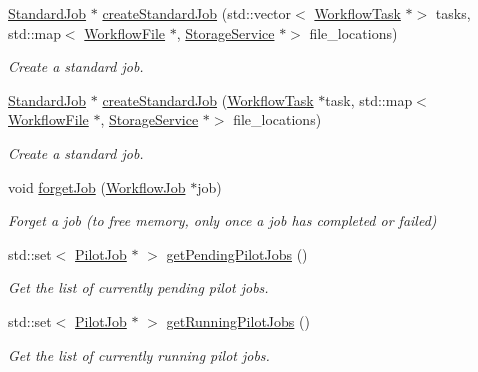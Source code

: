 \begin{DoxyCompactItemize}
\hyperlink{classwrench_1_1_standard_job}{Standard\+Job} $\ast$ \hyperlink{classwrench_1_1_job_manager_a1dc600a984151ddff2fe5d20525b33bc}{create\+Standard\+Job} (std\+::vector$<$ \hyperlink{classwrench_1_1_workflow_task}{Workflow\+Task} $\ast$$>$ tasks, std\+::map$<$ \hyperlink{classwrench_1_1_workflow_file}{Workflow\+File} $\ast$, \hyperlink{classwrench_1_1_storage_service}{Storage\+Service} $\ast$$>$ file\+\_\+locations)
\begin{DoxyCompactList}\small\item\em Create a standard job. \end{DoxyCompactList}\item 
\hyperlink{classwrench_1_1_standard_job}{Standard\+Job} $\ast$ \hyperlink{classwrench_1_1_job_manager_a42271d359373df86fdb59aeeaf0a4abc}{create\+Standard\+Job} (\hyperlink{classwrench_1_1_workflow_task}{Workflow\+Task} $\ast$task, std\+::map$<$ \hyperlink{classwrench_1_1_workflow_file}{Workflow\+File} $\ast$, \hyperlink{classwrench_1_1_storage_service}{Storage\+Service} $\ast$$>$ file\+\_\+locations)
\begin{DoxyCompactList}\small\item\em Create a standard job. \end{DoxyCompactList}\item 
void \hyperlink{classwrench_1_1_job_manager_ab10f770cc7ce3c022f889ad9cc3fcf0b}{forget\+Job} (\hyperlink{classwrench_1_1_workflow_job}{Workflow\+Job} $\ast$job)
\begin{DoxyCompactList}\small\item\em Forget a job (to free memory, only once a job has completed or failed) \end{DoxyCompactList}\item 
std\+::set$<$ \hyperlink{classwrench_1_1_pilot_job}{Pilot\+Job} $\ast$ $>$ \hyperlink{classwrench_1_1_job_manager_ad7f55858aa45b87289d5f35c4ccfad56}{get\+Pending\+Pilot\+Jobs} ()
\begin{DoxyCompactList}\small\item\em Get the list of currently pending pilot jobs. \end{DoxyCompactList}\item 
std\+::set$<$ \hyperlink{classwrench_1_1_pilot_job}{Pilot\+Job} $\ast$ $>$ \hyperlink{classwrench_1_1_job_manager_aeb91b23edf40378e49929f47e95f1ea6}{get\+Running\+Pilot\+Jobs} ()
\begin{DoxyCompactList}\small\item\em Get the list of currently running pilot jobs. \end{DoxyCompactList}\item 
$$
\end{DoxyCompactItemize}
